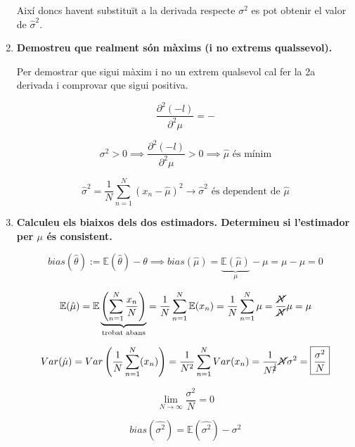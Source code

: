 \documentclass[a4paper]{article}
\begin{document}
\begin{enumerate}
Així doncs havent substituït a la derivada respecte $\sigma^2$ es pot obtenir el valor de $\hat{\sigma}^2$.

\item \textbf{Demostreu que realment són màxims (i no extrems qualssevol).}

Per demostrar que sigui màxim i no un extrem qualsevol cal fer la 2a derivada i comprovar que sigui positiva.

$$ \frac{\partial^2 (-l)}{\partial^2 \mu} = - $$

$$ \sigma^2 > 0 \implies \frac{\partial^2(-l)}{\partial^2\mu} > 0 \implies \hat{\mu} \text{ és mínim}$$

$$ \hat{\sigma}^2 = \frac{1}{N} \sum_{n=1}^N (x_n - \hat{\mu})^2 \rightarrow \hat{\sigma}^2 \text{ és dependent de } \hat{\mu}$$

\item \textbf{Calculeu els biaixos dels dos estimadors. Determineu si l'estimador per $\mu$ és consistent.}

$$ bias(\hat{\theta}) := \mathbb{E}(\hat{\theta}) - \theta \implies bias(\hat{\mu}) = \underbrace{\mathbb{E}(\hat{\mu})}_{\mu} - \mu = \mu - \mu = 0 $$

$$ \mathbb{E}(\hat{\mu}) = \mathbb{E}\underbrace{\left(\sum_{n=1}^N \frac{x_n}{N}\right)}_{\text{trobat abans}} = \frac{1}{N}\sum_{n=1}^N \mathbb{E}(x_n) = \frac{1}{N}\sum_{n=1}^N \mu = \frac{\cancel{N}}{\cancel{N}}\mu = \mu$$

$$ Var(\hat{\mu}) = Var\left(\frac{1}{N} \sum_{n=1}^{N}(x_n)\right) = \frac{1}{N^2} \sum_{n=1}^{N}Var(x_n) = \frac{1}{N^{\cancel{2}}}\cancel{N}\sigma^2 = \boxed{\frac{\sigma^2}{N}}  $$

$$\lim_{N\to\infty} \frac{\sigma^2}{N} = 0$$

$$ bias(\hat{\sigma^2}) = \mathbb{E}(\hat{\sigma^2}) - \sigma^2 $$


\end{enumerate}
\end{document}
